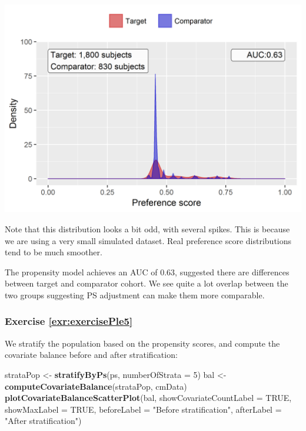 \documentclass[11pt]{book}
\newenvironment{Shaded}{\begin{snugshade}}{\end{snugshade}}
\newcommand{\KeywordTok}[1]{\textcolor[rgb]{0.13,0.29,0.53}{\textbf{#1}}}
\newcommand{\DataTypeTok}[1]{\textcolor[rgb]{0.13,0.29,0.53}{#1}}
\newcommand{\DecValTok}[1]{\textcolor[rgb]{0.00,0.00,0.81}{#1}}
\newcommand{\StringTok}[1]{\textcolor[rgb]{0.31,0.60,0.02}{#1}}
\newcommand{\OtherTok}[1]{\textcolor[rgb]{0.56,0.35,0.01}{#1}}
\newcommand{\NormalTok}[1]{#1}
\theoremstyle{definition}
\theoremstyle{definition}
\theoremstyle{definition}
\theoremstyle{remark}
\begin{document}
\begin{center}\includegraphics[width=0.8\linewidth]{images/SuggestedAnswers/ps} \end{center}

Note that this distribution looks a bit odd, with several spikes. This
is because we are using a very small simulated dataset. Real preference
score distributions tend to be much smoother.

The propensity model achieves an AUC of 0.63, suggested there are
differences between target and comparator cohort. We see quite a lot
overlap between the two groups suggesting PS adjustment can make them
more comparable.

\subsubsection*{Exercise
\ref{exr:exercisePle5}}\label{exercise-refexrexerciseple5}

We stratify the population based on the propensity scores, and compute
the covariate balance before and after stratification:

\begin{Shaded}
\begin{Highlighting}[]
\NormalTok{strataPop <-}\StringTok{ }\KeywordTok{stratifyByPs}\NormalTok{(ps, }\DataTypeTok{numberOfStrata =} \DecValTok{5}\NormalTok{)}
\NormalTok{bal <-}\StringTok{ }\KeywordTok{computeCovariateBalance}\NormalTok{(strataPop, cmData)}
\KeywordTok{plotCovariateBalanceScatterPlot}\NormalTok{(bal, }
                                \DataTypeTok{showCovariateCountLabel =} \OtherTok{TRUE}\NormalTok{, }
                                \DataTypeTok{showMaxLabel =} \OtherTok{TRUE}\NormalTok{, }
                                \DataTypeTok{beforeLabel =} \StringTok{"Before stratification"}\NormalTok{, }
                                \DataTypeTok{afterLabel =} \StringTok{"After stratification"}\NormalTok{)}
\end{Highlighting}
\end{Shaded}
\end{document}
